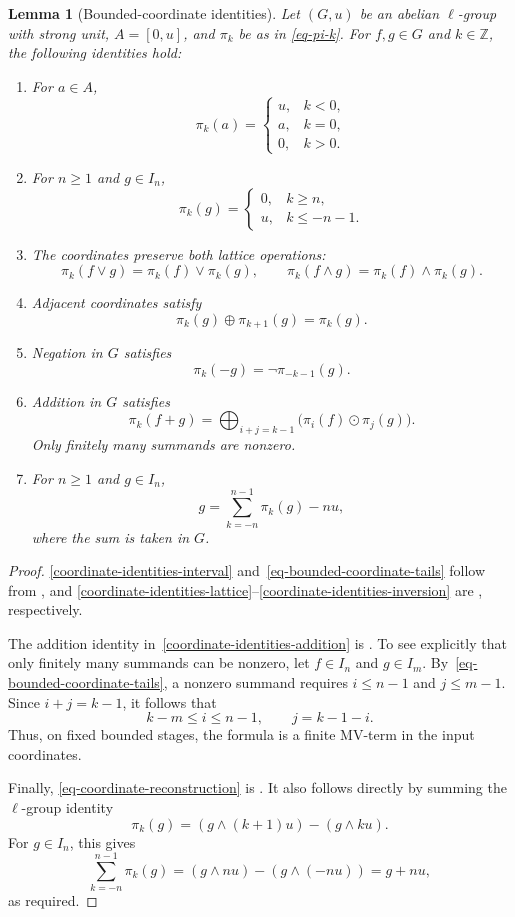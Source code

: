 \documentclass[preprint,3p]{elsarticle}
\theoremstyle{plain}
\newtheorem{lem}[thm]{Lemma}
\theoremstyle{definition}
\numberwithin{equation}{section}
\begin{document}
\begin{lem}[Bounded-coordinate identities]
\label{lem-coordinate-identities}
Let $(G,u)$ be an abelian $\ell$-group with strong unit,
$A=[0,u]$, and $\pi_k$ be as in \eqref{eq-pi-k}.
For $f,g\in G$ and $k\in\mathbb Z$, the following identities hold:
\begin{enumerate}[label=(\arabic*),ref=(\arabic*)]
\item\label{coordinate-identities-interval}
For $a\in A$,
\[
 \pi_k(a)=
 \begin{cases}
  u,&k<0,\\
  a,&k=0,\\
  0,&k>0.
 \end{cases}
\]
\item\label{eq-bounded-coordinate-tails}
For $n\geq1$ and $g\in I_n$,
\[
 \pi_k(g)=
 \begin{cases}
  0,&k\geq n,\\
  u,&k\leq-n-1.
 \end{cases}
\]
\item\label{coordinate-identities-lattice}
The coordinates preserve both lattice operations:
\[
 \pi_k(f\vee g)=\pi_k(f)\vee\pi_k(g),
 \qquad
 \pi_k(f\wedge g)=\pi_k(f)\wedge\pi_k(g).
\]
\item\label{coordinate-identities-absorption}
Adjacent coordinates satisfy
\[
 \pi_k(g)\oplus\pi_{k+1}(g)=\pi_k(g).
\]
\item\label{coordinate-identities-inversion}
Negation in $G$ satisfies
\[
 \pi_k(-g)=\neg\pi_{-k-1}(g).
\]
\item\label{coordinate-identities-addition}
Addition in $G$ satisfies
\[
 \pi_k(f+g)
 =\bigoplus_{i+j=k-1}\bigl(\pi_i(f)\odot\pi_j(g)\bigr).
\]
Only finitely many summands are nonzero.
\item\label{eq-coordinate-reconstruction}
For $n\geq1$ and $g\in I_n$,
\[
 g=\sum_{k=-n}^{n-1}\pi_k(g)-nu,
\]
where the sum is taken in $G$.
\end{enumerate}
\end{lem}

\begin{proof}
\ref{coordinate-identities-interval} and~\ref{eq-bounded-coordinate-tails}
follow from \cite[Proposition~2.11(1)--(3)]{Ball2002}, and
\ref{coordinate-identities-lattice}--\ref{coordinate-identities-inversion}
are \cite[Proposition~2.11(8)--(10)]{Ball2002}, respectively.

The addition identity in~\ref{coordinate-identities-addition} is
\cite[Proposition~2.11(11)]{Ball2002}.
To see explicitly that only finitely many summands can be nonzero,
let $f\in I_n$ and $g\in I_m$.
By~\ref{eq-bounded-coordinate-tails}, a nonzero summand requires
$i\leq n-1$ and $j\leq m-1$.
Since $i+j=k-1$, it follows that
\[
 k-m\leq i\leq n-1,\qquad j=k-1-i.
\]
Thus, on fixed bounded stages, the formula is a finite MV-term
in the input coordinates.

Finally, \ref{eq-coordinate-reconstruction} is
\cite[Proposition~2.11(16)]{Ball2002}.
It also follows directly by summing the $\ell$-group identity
\[
 \pi_k(g)=(g\wedge(k+1)u)-(g\wedge ku).
\]
For $g\in I_n$, this gives
\[
 \sum_{k=-n}^{n-1}\pi_k(g)
 =(g\wedge nu)-(g\wedge(-nu))
 =g+nu,
\]
as required.
\end{proof}
\end{document}
